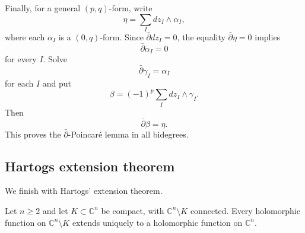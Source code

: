 Finally, for a general $(p,q)$-form, write
$$
\eta
=
\sum_I dz_I\wedge\alpha_I,
$$
where each $\alpha_I$ is a $(0,q)$-form.
Since $\bar\partial dz_I=0$, the equality
$\bar\partial\eta=0$ implies
$$
\bar\partial\alpha_I=0
$$
for every $I$. Solve
$$
\bar\partial\gamma_I=\alpha_I
$$
for each $I$ and put
$$
\beta
=
(-1)^p
\sum_I
dz_I\wedge\gamma_I.
$$
Then
$$
\bar\partial\beta=\eta.
$$
This proves the
$\bar\partial$-Poincaré lemma in all
bidegrees.

\subsection{Hartogs extension theorem}
\label{subsection-hartogs-extension}

\medskip\noindent
We finish with Hartogs' extension theorem.

\begin{theorem}
\label{theorem-hartogs-extension}
Let $n\geq2$ and let
$K\subset\mathbb C^n$ be compact, with
$\mathbb C^n\setminus K$ connected. Every
holomorphic function on
$\mathbb C^n\setminus K$ extends uniquely to
a holomorphic function on $\mathbb C^n$.
\end{theorem}

